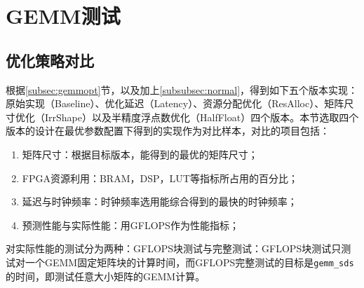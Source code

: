 \section{GEMM测试}

\subsection{优化策略对比}\label{subsec:compare}

根据\ref{subsec:gemmopt}节，以及加上\ref{subsubsec:normal}，得到如下五个版本实现：原始实现（Baseline）、优化延迟（Latency）、资源分配优化（ResAlloc）、矩阵尺寸优化（IrrShape）以及半精度浮点数优化（HalfFloat）四个版本。本节选取四个版本的设计在最优参数配置下得到的实现作为对比样本，对比的项目包括：
\begin{enumerate}
\item 矩阵尺寸：根据目标版本，能得到的最优的矩阵尺寸；
\item FPGA资源利用：BRAM，DSP，LUT等指标所占用的百分比；
\item 延迟与时钟频率：时钟频率选用能综合得到的最快的时钟频率；
\item 预测性能与实际性能：用GFLOPS作为性能指标；
\end{enumerate}

对实际性能的测试分为两种：GFLOPS块测试与完整测试：GFLOPS块测试只测试对一个GEMM固定矩阵块的计算时间，而GFLOPS完整测试的目标是\texttt{gemm\_sds}的时间，即测试任意大小矩阵的GEMM计算。

